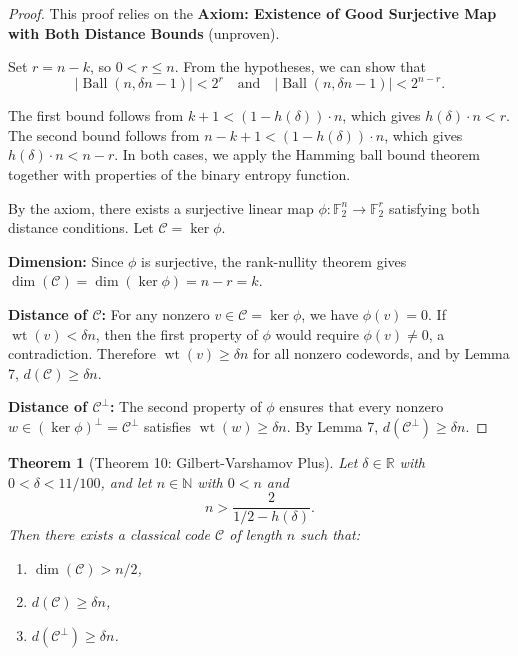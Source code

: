 \documentclass[11pt]{article}
\theoremstyle{plain}
\newtheorem*{theorem}{Theorem}
\theoremstyle{definition}
\theoremstyle{remark}
\renewcommand{\ker}{\operatorname{ker}}
\begin{document}
\begin{proof}
This proof relies on the \textbf{Axiom: Existence of Good Surjective Map with Both Distance Bounds} (unproven).

Set $r = n - k$, so $0 < r \leq n$. From the hypotheses, we can show that
\[
|\operatorname{Ball}(n, \delta n - 1)| < 2^r \quad \text{and} \quad |\operatorname{Ball}(n, \delta n - 1)| < 2^{n-r}.
\]

The first bound follows from $k + 1 < (1 - h(\delta)) \cdot n$, which gives $h(\delta) \cdot n < r$. The second bound follows from $n - k + 1 < (1 - h(\delta)) \cdot n$, which gives $h(\delta) \cdot n < n - r$. In both cases, we apply the Hamming ball bound theorem together with properties of the binary entropy function.

By the axiom, there exists a surjective linear map $\phi : \mathbb{F}_2^n \to \mathbb{F}_2^r$ satisfying both distance conditions. Let $\mathcal{C} = \ker \phi$.

\textbf{Dimension:} Since $\phi$ is surjective, the rank-nullity theorem gives $\dim(\mathcal{C}) = \dim(\ker \phi) = n - r = k$.

\textbf{Distance of $\mathcal{C}$:} For any nonzero $v \in \mathcal{C} = \ker \phi$, we have $\phi(v) = 0$. If $\operatorname{wt}(v) < \delta n$, then the first property of $\phi$ would require $\phi(v) \neq 0$, a contradiction. Therefore $\operatorname{wt}(v) \geq \delta n$ for all nonzero codewords, and by Lemma 7, $d(\mathcal{C}) \geq \delta n$.

\textbf{Distance of $\mathcal{C}^\perp$:} The second property of $\phi$ ensures that every nonzero $w \in (\ker \phi)^\perp = \mathcal{C}^\perp$ satisfies $\operatorname{wt}(w) \geq \delta n$. By Lemma 7, $d(\mathcal{C}^\perp) \geq \delta n$.
\end{proof}

\begin{theorem}[Theorem 10: Gilbert-Varshamov Plus]
Let $\delta \in \mathbb{R}$ with $0 < \delta < 11/100$, and let $n \in \mathbb{N}$ with $0 < n$ and
\[
n > \frac{2}{1/2 - h(\delta)}.
\]
Then there exists a classical code $\mathcal{C}$ of length $n$ such that:
\begin{enumerate}
\item $\dim(\mathcal{C}) > n/2$,
\item $d(\mathcal{C}) \geq \delta n$,
\item $d(\mathcal{C}^\perp) \geq \delta n$.
\end{enumerate}
\end{theorem}
\end{document}

